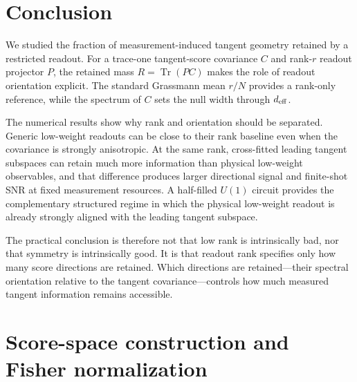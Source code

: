 \documentclass[aps,prx,reprint,superscriptaddress,nofootinbib,longbibliography]{revtex4-2}
\newcommand{\Tr}{\operatorname{Tr}}
\newcommand{\deff}{d_{\rm eff}}
\begin{document}
\section{Conclusion}

We studied the fraction of measurement-induced tangent geometry retained by a restricted readout. For a trace-one tangent-score covariance $C$ and rank-$r$ readout projector $P$, the retained mass $R=\Tr(PC)$ makes the role of readout orientation explicit. The standard Grassmann mean $r/N$ provides a rank-only reference, while the spectrum of $C$ sets the null width through $\deff$.

The numerical results show why rank and orientation should be separated. Generic low-weight readouts can be close to their rank baseline even when the covariance is strongly anisotropic. At the same rank, cross-fitted leading tangent subspaces can retain much more information than physical low-weight observables, and that difference produces larger directional signal and finite-shot SNR at fixed measurement resources. A half-filled $U(1)$ circuit provides the complementary structured regime in which the physical low-weight readout is already strongly aligned with the leading tangent subspace.

The practical conclusion is therefore not that low rank is intrinsically bad, nor that symmetry is intrinsically good. It is that readout rank specifies only how many score directions are retained. Which directions are retained---their spectral orientation relative to the tangent covariance---controls how much measured tangent information remains accessible.



\appendix

\section{Score-space construction and Fisher normalization}
\label{app:score_geometry}
\end{document}
